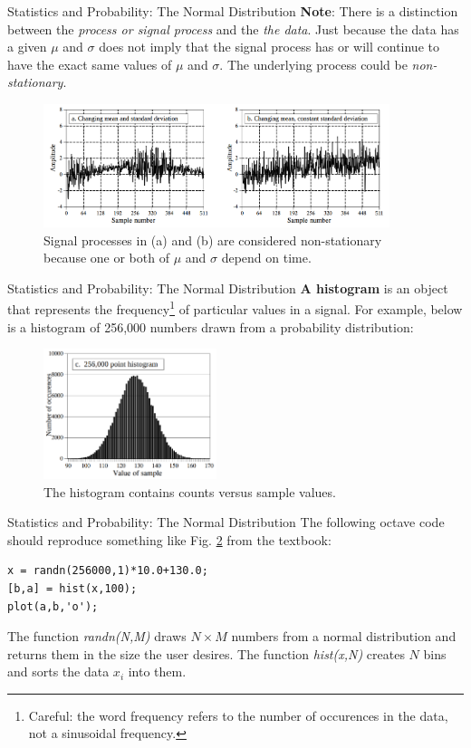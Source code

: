 \documentclass{beamer}
\begin{document}
\begin{frame}[fragile]{Statistics and Probability: The Normal Distribution}
\small
\textbf{Note}: There is a distinction between the \textit{process or signal process} and the \textit{the data}.  Just because the data has a given $\mu$ and $\sigma$ does not imply that the signal process has or will continue to have the exact same values of $\mu$ and $\sigma$.  The underlying process could be \textit{non-stationary}.
\begin{figure}
\centering
\includegraphics[width=0.9\textwidth]{figures/non_stationary.png}
\caption{\label{fig:non_stationary} Signal processes in (a) and (b) are considered \alert{non-stationary} because one or both of $\mu$ and $\sigma$ depend on time.}
\end{figure}
\end{frame}

\begin{frame}[fragile]{Statistics and Probability: The Normal Distribution}
\small
\textbf{A histogram} is an object that represents the frequency\footnote{Careful: the word frequency refers to the number of occurences in the data, not a sinusoidal frequency.} of particular values in a signal.  For example, below is a histogram of 256,000 numbers drawn from a probability distribution:
\begin{figure}
\centering
\includegraphics[width=0.45\textwidth]{figures/hist.png}
\caption{\label{fig:hist} The histogram contains counts versus sample values.}
\end{figure}
\end{frame}

\begin{frame}[fragile]{Statistics and Probability: The Normal Distribution}
The following octave code should reproduce something like Fig. \ref{fig:hist} from the textbook:
\begin{verbatim}
x = randn(256000,1)*10.0+130.0;
[b,a] = hist(x,100);
plot(a,b,'o');
\end{verbatim}
The function \textit{randn(N,M)} draws $N \times M$ numbers from a normal distribution and returns them in the size the user desires.  The function \textit{hist(x,N)} creates $N$ bins and sorts the data $x_i$ into them.
\end{frame}
\end{document}
